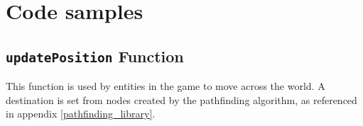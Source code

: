 \chapter{Code samples}

\section{\texttt{updatePosition} Function}\label{update_position}

This function is used by entities in the game to move across the world. A destination is set from nodes created by the pathfinding algorithm, as referenced in appendix \ref{pathfinding_library}.
